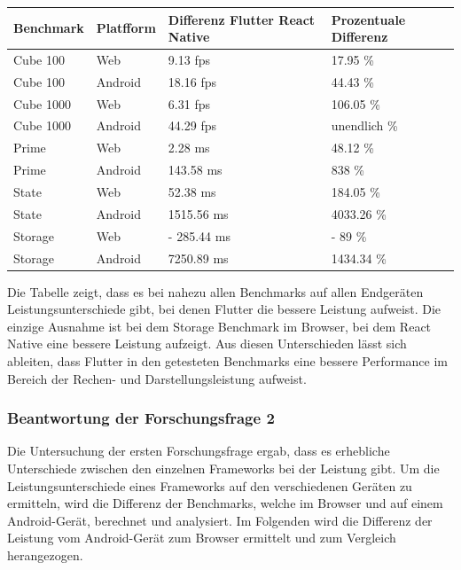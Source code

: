 \begin{table}[h!]
    \centering
    \begin{tabular}{|l|l|p{4cm}|l|}
    \toprule
    \textbf{Benchmark} & \textbf{Platfform} & \textbf{Differenz Flutter React Native}& \textbf{Prozentuale Differenz} \\
    \midrule
    Cube 100   & Web   & 9.13 fps & 17.95 \%       \\
    Cube 100   & Android   & 18.16 fps & 44.43 \%      \\
    Cube 1000  & Web & 6.31 fps & 106.05 \%    \\
    Cube 1000  & Android & 44.29 fps & unendlich \%     \\
    Prime      & Web   & 2.28 ms & 48.12  \%   \\
    Prime      & Android   & 143.58 ms & 838 \%    \\
    State      & Web   & 52.38 ms & 184.05 \%  \\
    State      & Android   & 1515.56 ms & 4033.26 \%   \\
    Storage    & Web   & - 285.44 ms & - 89 \%  \\
    Storage    & Android   & 7250.89 ms & 1434.34 \% \\
    \bottomrule
    \end{tabular}
\end{table}

Die Tabelle zeigt, dass es bei nahezu allen Benchmarks auf allen Endgeräten Leistungsunterschiede gibt, bei denen Flutter die bessere Leistung aufweist. Die einzige Ausnahme ist bei dem Storage Benchmark im Browser, bei dem React Native eine bessere Leistung aufzeigt. Aus diesen Unterschieden lässt sich ableiten, dass Flutter in den getesteten Benchmarks eine bessere Performance im Bereich der Rechen- und Darstellungsleistung aufweist.

\subsubsection{Beantwortung der Forschungsfrage 2}
Die Untersuchung der ersten Forschungsfrage ergab, dass es erhebliche Unterschiede zwischen den einzelnen Frameworks bei der Leistung gibt. Um die Leistungsunterschiede eines Frameworks auf den verschiedenen Geräten zu ermitteln, wird die Differenz der Benchmarks, welche im Browser und auf einem Android-Gerät, berechnet und analysiert. Im Folgenden wird die Differenz der Leistung vom Android-Gerät zum Browser ermittelt und zum Vergleich herangezogen.

